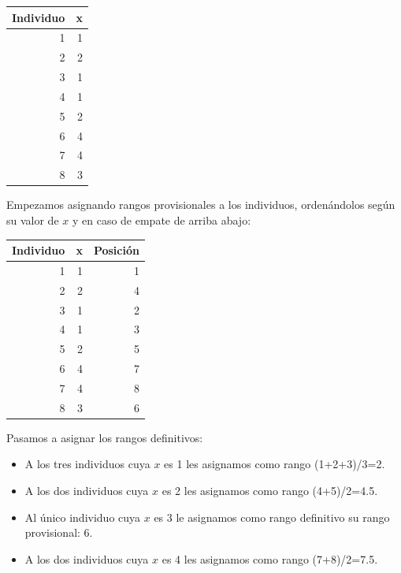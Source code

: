 \documentclass[
]{book}
\providecommand{\tightlist}{%
  \setlength{\itemsep}{0pt}\setlength{\parskip}{0pt}}
\theoremstyle{definition}
\theoremstyle{definition}
\theoremstyle{definition}
\theoremstyle{definition}
\theoremstyle{remark}
\begin{document}
\begin{table}
\centering
\begin{tabular}{r|r}
\hline
Individuo & x\\
\hline
1 & 1\\
\hline
2 & 2\\
\hline
3 & 1\\
\hline
4 & 1\\
\hline
5 & 2\\
\hline
6 & 4\\
\hline
7 & 4\\
\hline
8 & 3\\
\hline
\end{tabular}
\end{table}

Empezamos asignando rangos provisionales a los individuos, ordenándolos según su valor de \(x\) y en caso de empate de arriba abajo:

\begin{table}
\centering
\begin{tabular}{r|r|r}
\hline
Individuo & x & Posición\\
\hline
1 & 1 & 1\\
\hline
2 & 2 & 4\\
\hline
3 & 1 & 2\\
\hline
4 & 1 & 3\\
\hline
5 & 2 & 5\\
\hline
6 & 4 & 7\\
\hline
7 & 4 & 8\\
\hline
8 & 3 & 6\\
\hline
\end{tabular}
\end{table}

Pasamos a asignar los rangos definitivos:

\begin{itemize}
\tightlist
\item
  A los tres individuos cuya \(x\) es 1 les asignamos como rango (1+2+3)/3=2.
\item
  A los dos individuos cuya \(x\) es 2 les asignamos como rango (4+5)/2=4.5.
\item
  Al único individuo cuya \(x\) es 3 le asignamos como rango definitivo su rango provisional: 6.
\item
  A los dos individuos cuya \(x\) es 4 les asignamos como rango (7+8)/2=7.5.
\end{itemize}
\end{document}
